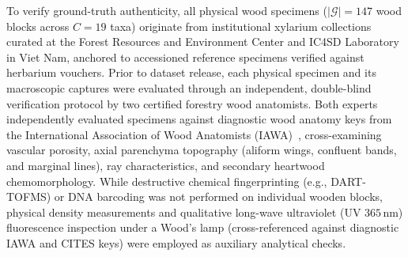 \documentclass[a4paper,fleqn,12pt]{cas-sc}
\begin{document}
To verify ground-truth authenticity, all physical wood specimens ($|\mathcal{G}| = 147$ wood blocks across $C = 19$ taxa) originate from institutional xylarium collections curated at the Forest Resources and Environment Center and IC4SD Laboratory in Viet Nam, anchored to accessioned reference specimens verified against herbarium vouchers. Prior to dataset release, each physical specimen and its macroscopic captures were evaluated through an independent, double-blind verification protocol by two certified forestry wood anatomists. Both experts independently evaluated specimens against diagnostic wood anatomy keys from the International Association of Wood Anatomists (IAWA)~\cite{iawa1989,wiedenhoeft2011}, cross-examining vascular porosity, axial parenchyma topography (aliform wings, confluent bands, and marginal lines), ray characteristics, and secondary heartwood chemomorphology. While destructive chemical fingerprinting (e.g., DART-TOFMS) or DNA barcoding was not performed on individual wooden blocks, physical density measurements and qualitative long-wave ultraviolet (UV $365\,\text{nm}$) fluorescence inspection under a Wood's lamp (cross-referenced against diagnostic IAWA and CITES keys) were employed as auxiliary analytical checks.
\end{document}
